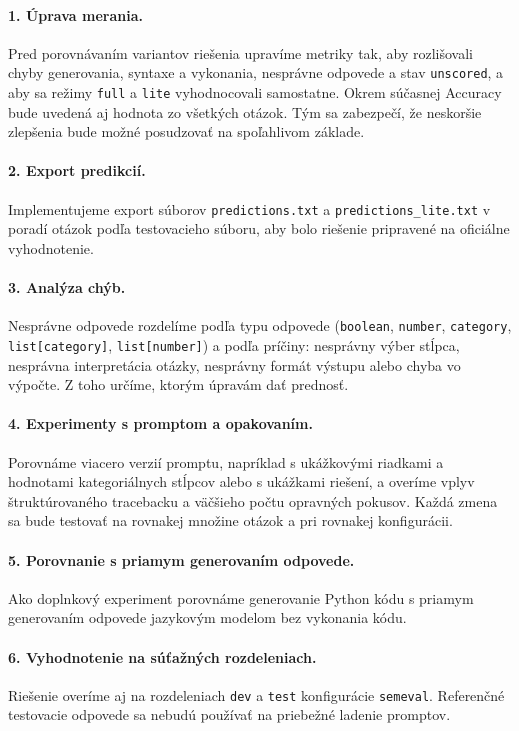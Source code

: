 \paragraph{1. Úprava merania.} Pred porovnávaním variantov riešenia upravíme metriky tak, aby rozlišovali chyby generovania, syntaxe a vykonania, nesprávne odpovede a stav \texttt{unscored}, a aby sa režimy \texttt{full} a \texttt{lite} vyhodnocovali samostatne. Okrem súčasnej Accuracy bude uvedená aj hodnota zo všetkých otázok. Tým sa zabezpečí, že neskoršie zlepšenia bude možné posudzovať na spoľahlivom základe.

\paragraph{2. Export predikcií.} Implementujeme export súborov \texttt{predictions.txt} a \texttt{predictions\_lite.txt} v poradí otázok podľa testovacieho súboru, aby bolo riešenie pripravené na oficiálne vyhodnotenie.

\paragraph{3. Analýza chýb.} Nesprávne odpovede rozdelíme podľa typu odpovede (\texttt{boolean}, \texttt{number}, \texttt{category}, \texttt{list[category]}, \texttt{list[number]}) a podľa príčiny: nesprávny výber stĺpca, nesprávna interpretácia otázky, nesprávny formát výstupu alebo chyba vo výpočte. Z toho určíme, ktorým úpravám dať prednosť.

\paragraph{4. Experimenty s promptom a opakovaním.} Porovnáme viacero verzií promptu, napríklad s ukážkovými riadkami a hodnotami kategoriálnych stĺpcov alebo s ukážkami riešení, a overíme vplyv štruktúrovaného tracebacku a väčšieho počtu opravných pokusov. Každá zmena sa bude testovať na rovnakej množine otázok a pri rovnakej konfigurácii.

\paragraph{5. Porovnanie s priamym generovaním odpovede.} Ako doplnkový experiment porovnáme generovanie Python kódu s priamym generovaním odpovede jazykovým modelom bez vykonania kódu.

\paragraph{6. Vyhodnotenie na súťažných rozdeleniach.} Riešenie overíme aj na rozdeleniach \texttt{dev} a \texttt{test} konfigurácie \texttt{semeval}. Referenčné testovacie odpovede sa nebudú používať na priebežné ladenie promptov.

